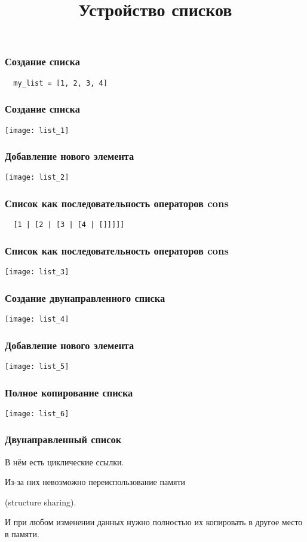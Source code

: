 \documentclass[10pt]{beamer}
\title{Устройство списков}
\begin{document}
\begin{frame}[fragile]
  \frametitle{Создание списка}
  \begin{lstlisting}
  my_list = [1, 2, 3, 4]
  \end{lstlisting}
\end{frame}

\begin{frame}
  \frametitle{Создание списка}
  \centering
  \texttt{[image: list\_1]}
\end{frame}

\begin{frame}
  \frametitle{Добавление нового элемента}
  \centering
  \texttt{[image: list\_2]}
\end{frame}

\begin{frame}[fragile]
  \frametitle{Список как последовательность операторов cons}
  \begin{lstlisting}
  [1 | [2 | [3 | [4 | []]]]]
  \end{lstlisting}
\end{frame}

\begin{frame}
  \frametitle{Список как последовательность операторов cons}
  \centering
  \texttt{[image: list\_3]}
\end{frame}

\begin{frame}
  \frametitle{Создание двунаправленного списка}
  \centering
  \texttt{[image: list\_4]}
\end{frame}

\begin{frame}
  \frametitle{Добавление нового элемента}
  \centering
  \texttt{[image: list\_5]}
\end{frame}

\begin{frame}
  \frametitle{Полное копирование списка}
  \centering
  \texttt{[image: list\_6]}
\end{frame}

\begin{frame}
  \frametitle{Двунаправленный список}
  В нём есть циклические ссылки.
  \par \bigskip
  Из-за них невозможно переиспользование памяти
  \par
  (structure sharing).
  \par \bigskip
  И при любом изменении данных нужно полностью их копировать в другое место в памяти.
\end{frame}
\end{document}

